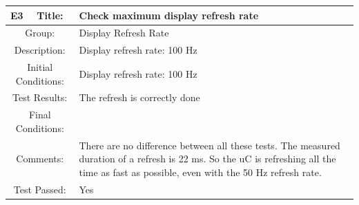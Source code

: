 \documentclass[12pt]{article}
\begin{document}
		\begin{table}[H]
	\begin{center}
		\begin{tabular}{| m{2cm}|m{2cm}|m{12cm}|}
			\hline 
			\bf E3&\bf Title:&\bf Check maximum display refresh rate\\ 
			\hline 
			\multicolumn{2}{|c|}{Group:}&Display Refresh Rate\\ 
			\hline 
			\multicolumn{2}{|c|}{Description:}&Display refresh rate: 100 Hz\\ 
			\hline 
			\multicolumn{2}{|c|}{Initial Conditions:}&Display refresh rate: 100 Hz\\ 
			\hline 
			\multicolumn{2}{|c|}{Test Results:}&The refresh is correctly done\\ 
			\hline 
			\multicolumn{2}{|c|}{Final Conditions:}&\\ 
			\hline 
			\multicolumn{2}{|c|}{Comments:}&There are no difference between all these tests. The measured duration of a refresh is 22 ms. 
			So the uC is refreshing all the time as fast as possible, even with the 50 Hz refresh rate.\\ 
			\hline 
			\multicolumn{2}{|c|}{Test Passed:}&Yes \\ 
			\hline 
		\end{tabular} 
	\end{center}
\end{table}	
\end{document}
